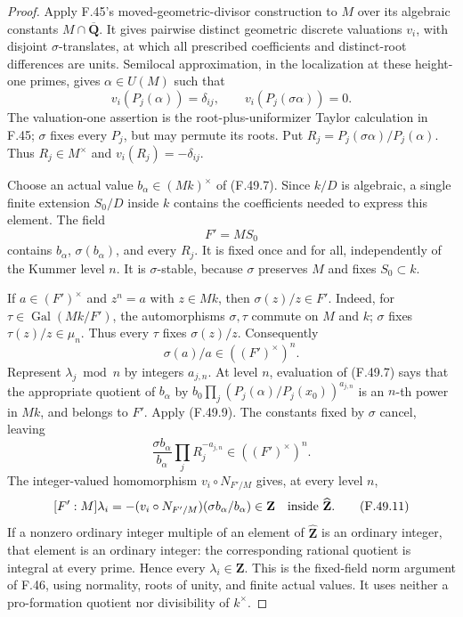 \begin{proof}
Apply F.45's moved-geometric-divisor construction to \(M\) over
its algebraic constants \(M\cap\overline{\mathbf Q}\).
It gives pairwise distinct geometric discrete valuations \(v_i\),
with disjoint \(\sigma\)-translates, at which all prescribed
coefficients and distinct-root differences are units.
Semilocal approximation, in the localization at these
height-one primes, gives \(\alpha\in U(M)\) such that
\[
 v_i(P_j(\alpha))=\delta_{ij},\qquad
 v_i(P_j(\sigma\alpha))=0.
 \tag{F.49.8}
\]
The valuation-one assertion is the root-plus-uniformizer Taylor
calculation in F.45; \(\sigma\) fixes every \(P_j\), but may permute
its roots. Put \(R_j=P_j(\sigma\alpha)/P_j(\alpha)\).
Thus \(R_j\in M^\times\) and \(v_i(R_j)=-\delta_{ij}\).

Choose an actual value \(b_\alpha\in(Mk)^\times\) of (F.49.7).
Since \(k/D\) is algebraic, a single finite extension
\(S_0/D\) inside \(k\) contains the coefficients needed to express
this element. The field
\[
                              F'=MS_0
\]
contains \(b_\alpha\), \(\sigma(b_\alpha)\), and every \(R_j\).
It is fixed once and for all, independently of the Kummer level \(n\).
It is \(\sigma\)-stable, because \(\sigma\) preserves \(M\) and
fixes \(S_0\subset k\).

If \(a\in(F')^\times\) and \(z^n=a\) with \(z\in Mk\), then
\(\sigma(z)/z\in F'\). Indeed, for
\(\tau\in\operatorname{Gal}(Mk/F')\), the automorphisms
\(\sigma,\tau\) commute on \(M\) and \(k\); \(\sigma\) fixes
\(\tau(z)/z\in\mu_n\). Thus every \(\tau\) fixes
\(\sigma(z)/z\). Consequently
\[
                      \sigma(a)/a\in((F')^\times)^n.
 \tag{F.49.9}
\]
Represent \(\lambda_j\bmod n\) by integers \(a_{j,n}\).
At level \(n\), evaluation of (F.49.7) says that the appropriate
quotient of \(b_\alpha\) by
\(b_0\prod_j(P_j(\alpha)/P_j(x_0))^{a_{j,n}}\)
is an \(n\)-th power in \(Mk\), and belongs to \(F'\).
Apply (F.49.9). The constants fixed by \(\sigma\) cancel, leaving
\[
 \frac{\sigma b_\alpha}{b_\alpha}
        \prod_j R_j^{-a_{j,n}}\in((F')^\times)^n.
 \tag{F.49.10}
\]
The integer-valued homomorphism \(v_i\circ N_{F'/M}\) gives, at
every level \(n\),
\[
 [F':M]\lambda_i
      =-(v_i\circ N_{F'/M})(\sigma b_\alpha/b_\alpha)
                  \in\mathbf Z
      \quad\hbox{inside }\widehat{\mathbf Z}.
 \tag{F.49.11}
\]
If a nonzero ordinary integer multiple of an element of
\(\widehat{\mathbf Z}\) is an ordinary integer, that element is
an ordinary integer: the corresponding rational quotient is
integral at every prime. Hence every \(\lambda_i\in\mathbf Z\).
This is the fixed-field norm argument of F.46, using normality,
roots of unity, and finite actual values. It uses neither a
pro-formation quotient nor divisibility of \(k^\times\).


\end{proof}
